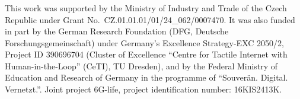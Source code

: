 \documentclass[runningheads]{llncs}
\begin{document}
\begin{credits}
\subsubsection{\ackname} This work was supported by the Ministry of Industry and Trade of the Czech Republic under Grant No.~CZ.01.01.01/01/24\_062/0007470. It was also funded in part by the German Research Foundation (DFG, Deutsche Forschungsgemeinschaft) under Germany’s Excellence Strategy-EXC 2050/2, Project ID 390696704 (Cluster of Excellence “Centre for Tactile Internet with Human-in-the-Loop” (CeTI), TU Dresden), and by the Federal Ministry of Education and Research of Germany in the programme of “Souverän. Digital. Vernetzt.”. Joint project 6G-life, project identification number: 16KIS2413K.
\end{credits}



\end{document}
